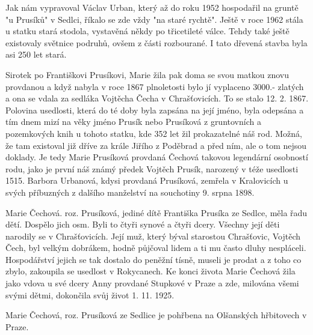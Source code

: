 \documentclass[../dejiny-rodu-prusiku.tex]{subfiles}
\begin{document}
Jak nám vypravoval Václav Urban, který až do roku 1952 hospodařil na gruntě "u Prusíků" v Sedlci, říkalo se zde vždy "na staré rychtě". Ještě v roce 1962 stála u statku stará stodola, vystavěná někdy po třicetileté válce. Tehdy také ještě existovaly světnice podruhů, ovšem z části rozbourané. I tato dřevená stavba byla asi 250 let stará.

Sirotek po Františkovi Prusíkovi, Marie žila pak doma se svou matkou znovu provdanou a když nabyla v roce 1867 plnoletosti bylo jí vyplaceno 3000.- zlatých a ona se vdala za sedláka Vojtěcha Čecha v Chrašťovicích. To se stalo 12. 2. 1867. Polovina usedlosti, která do té doby byla zapsána na její jméno, byla odepsána a tím dnem mizí na věky jméno Prusík nebo Prusíková z gruntovních a pozemkových knih u tohoto statku, kde 352 let žil pro­kazatelné náš rod. Možná, že tam existoval již dříve za krále Jiřího z Poděbrad a před ním, ale o tom nejsou doklady. Je tedy Marie Prusíková provdaná Čechová takovou legendární osobností rodu, jako je první náš známý předek Vojtěch Prusík, narozený v téže usedlosti 1515. Barbora Urbanová, kdysi provdaná Prusíková, zemřela v Kralovicích u svých příbuzných z dalšího manželství na souchotiny 9. srpna 1898.

Marie Čechová. roz. Prusíková, jediné dítě Františka Prusíka ze Sedlce, měla řadu dětí. Dospělo jich osm. Byli to čtyři synové a čtyři dcery. Všechny její děti narodily se v Chrašťovicích. Její muž, který býval starostou Chrašťovic, Vojtěch Čech, byl velkým dobrá­kem, hodně půjčoval lidem a ti mu často dluhy nespláce­li. Hospodářství jejich se tak dostalo do peněžní tísně, museli je prodat a z toho co zbylo, zakoupila se usedlost v Rokycanech. Ke konci života Marie Čechová žila jako vdova u své dcery Anny provdané Stupkové v Praze a zde, milována všemi svými dětmi, dokončila svůj život 1. 11. 1925.

Marie Čechová, roz. Prusíková ze Sedlice je pohřbena na Olšanských hřbitovech v Praze.
\end{document}

